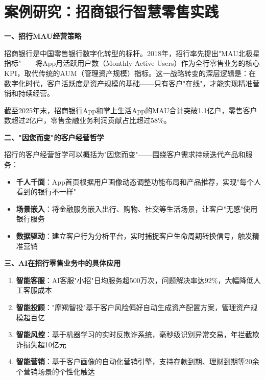 \section{案例研究：招商银行智慧零售实践}

\begin{casebox}[招商银行智慧零售实践]

\textbf{一、招行MAU经营策略}

招商银行是中国零售银行数字化转型的标杆。2018年，招行率先提出"MAU北极星指标"——将App月活跃用户数（Monthly Active Users）作为全行零售业务的核心KPI，取代传统的AUM（管理资产规模）指标。这一战略转变的深层逻辑是：在数字化时代，客户活跃度是资产规模的基础——只有客户"在线"，才能实现精准营销和持续经营。

截至2025年末，招商银行App和掌上生活App的MAU合计突破1.1亿户，零售客户数超过2亿户，零售金融业务利润贡献占比超过58\%。

\textbf{二、"因您而变"的客户经营哲学}

招行的客户经营哲学可以概括为"因您而变"——围绕客户需求持续迭代产品和服务：

\begin{itemize}[leftmargin=2em]
  \item \textbf{千人千面}：App首页根据用户画像动态调整功能布局和产品推荐，实现"每个人看到的银行不一样"
  \item \textbf{场景嵌入}：将金融服务嵌入出行、购物、社交等生活场景，让客户"无感"使用银行服务
  \item \textbf{数据驱动}：建立客户行为分析平台，实时捕捉客户生命周期转换信号，触发精准营销
\end{itemize}

\textbf{三、AI在招行零售业务中的具体应用}

\begin{enumerate}[leftmargin=2em]
  \item \textbf{智能客服}：AI客服"小招"日均服务超500万次，问题解决率达92\%，大幅降低人工客服成本
  \item \textbf{智能投顾}："摩羯智投"基于客户风险偏好自动生成资产配置方案，管理资产规模超百亿
  \item \textbf{智能风控}：基于机器学习的实时反欺诈系统，毫秒级识别异常交易，年拦截欺诈损失超10亿元
  \item \textbf{智能营销}：基于客户画像的自动化营销引擎，支持存款到期、理财到期等20余个营销场景的个性化触达
\end{enumerate}


\end{casebox}

